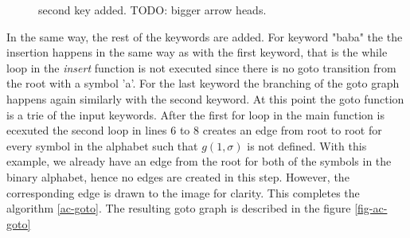 \documentclass[english,twoside,censored,csm,algorithms-track-2020]{HYthesisML}
\theoremstyle{plain}
\theoremstyle{definition}
\begin{document}
  \begin{figure}[h]
  \centering
  \caption{second key added. TODO: bigger arrow heads.} \label{fig-ac-step3}
\end{figure}

  In the same way, the rest of the keywords are added. For keyword "baba" the the insertion
  happens in the same way as with the first keyword, that is the while loop in the \textit{insert}
  function is not executed since there is no goto transition from the root with a symbol 'a'.
  For the last keyword the branching of the goto graph happens again
  similarly with the second keyword. At this point the goto function is a trie of the
  input keywords. After the first for loop in the main function is ecexuted 
  the second loop in lines 6 to 8 creates an edge from root to root for every symbol in the
  alphabet such that $g(1,\sigma)$ is not defined. With this example, we already have an edge from the
  root for both of the symbols in the binary alphabet, hence no edges are created in this step.
  However, the corresponding edge is drawn to the image for clarity. This completes the
  algorithm \ref{ac-goto}.
  The resulting goto graph is described in the figure \ref{fig-ac-goto}
\end{document}
